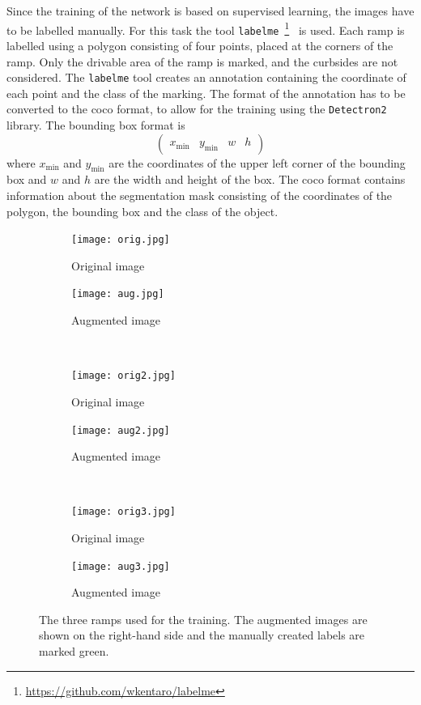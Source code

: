 Since the training of the network is based on supervised learning, the images have to be labelled manually.
For this task the tool \texttt{labelme}~\footnote{\url{https://github.com/wkentaro/labelme}}~\cite{Wada2018} is used.
Each ramp is labelled using a polygon consisting of four points, placed at the corners of the ramp.
Only the drivable area of the ramp is marked, and the curbsides are not considered.
The \texttt{labelme} tool creates an annotation containing the coordinate of each point and the class of the marking.
The format of the annotation has to be converted to the \gls{coco} format, to allow for the training using the \texttt{Detectron2} library.
The bounding box format is
\[
    \begin{pmatrix}
        x_\mathrm{min} & y_\mathrm{min} & w & h
    \end{pmatrix}
\]
where $x_\mathrm{min}$ and $y_\mathrm{min}$ are the coordinates of the upper left corner of the bounding box and $w$ and $h$ are the width and height of the box.
The \gls{coco} format contains information about the segmentation mask consisting of the coordinates of the polygon, the bounding box and the class of the object.
\begin{figure}[htb]
    \centering
    \begin{subfigure}{.47\linewidth}
        \centering
        \texttt{[image: orig.jpg]}
        \caption{Original image}
    \end{subfigure}
    \begin{subfigure}{.47\linewidth}
        \centering
        \texttt{[image: aug.jpg]}
        \caption{Augmented image}
    \end{subfigure}
    \\
    \begin{subfigure}{.47\linewidth}
        \centering
        \texttt{[image: orig2.jpg]}
        \caption{Original image}
    \end{subfigure}
    \begin{subfigure}{.47\linewidth}
        \centering
        \texttt{[image: aug2.jpg]}
        \caption{Augmented image}
    \end{subfigure}
    \\
    \begin{subfigure}{.47\linewidth}
        \centering
        \texttt{[image: orig3.jpg]}
        \caption{Original image}
    \end{subfigure}
    \begin{subfigure}{.47\linewidth}
        \centering
        \texttt{[image: aug3.jpg]}
        \caption{Augmented image}
    \end{subfigure}
    \caption[Examples of augmented images]{The three ramps used for the training. The augmented images are shown on the right-hand side and the manually created labels are marked green.}
    \label{fig:img_augmentated}
\end{figure}


